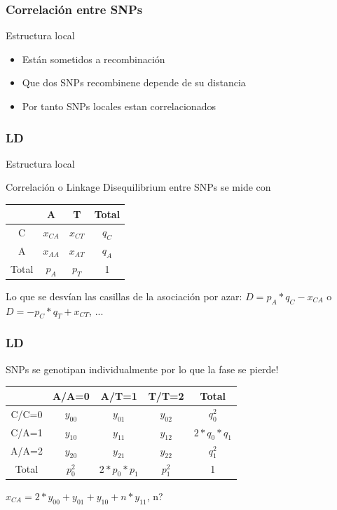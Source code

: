 \documentclass{beamer}\usepackage[]{graphicx}\usepackage[]{color}
\begin{document}
\begin{frame}[fragile] 
\frametitle{Correlaci\'on entre SNPs}
Estructura local

\begin{itemize}
  \item Est\'an sometidos a recombinación
  \item Que dos SNPs recombinene depende de su distancia
  \item Por tanto SNPs locales estan correlacionados
\end{itemize}
\end{frame}



\begin{frame}[fragile] 
\frametitle{LD}
Estructura local

Correlaci\'on o Linkage Disequilibrium entre SNPs se mide con 

\begin{table}[]
\centering
\begin{tabular}{c|cc|c}
  & A & T &  Total \\ \hline
C &  $x_{CA}$  &  $x_{CT}$  &  $q_C$ \\
A &  $x_{AA}$  &  $x_{AT}$  &  $q_A$  \\ \hline
Total & $p_A$  &  $p_T$  &   1 \\
\end{tabular}
\end{table}
Lo que se desvían las casillas de la asociaci\'on por azar:
$D=p_A*q_C - x_{CA}$ o $D=-p_C*q_T + x_{CT}$, ...
\end{frame}


\begin{frame}[fragile] 
\frametitle{LD}
SNPs se genotipan individualmente por lo que la fase se pierde! 

\begin{table}[]
\centering
\begin{tabular}{c|ccc|c}
 & A/A=0 & A/T=1 & T/T=2 &  Total \\ \hline
C/C=0 &  $y_{00}$  &  $y_{01}$ & $y_{02}$ & $q_0^2$ \\
C/A=1 &  $y_{10}$  &  $y_{11}$ & $y_{12}$ & $2*q_0*q_1$  \\ 
A/A=2 &  $y_{20}$  &  $y_{21}$ & $y_{22}$ & $q_1^2$  \\ \hline
Total & $p_0^2$  &  $2*p_0*p_1$  & $p_1^2$ &   1 \\
\end{tabular}
\end{table}
$x_{CA} =2*y_{00} + y_{01} + y_{10} +n*y_{11}$, n? 
\end{frame}
\end{document}
